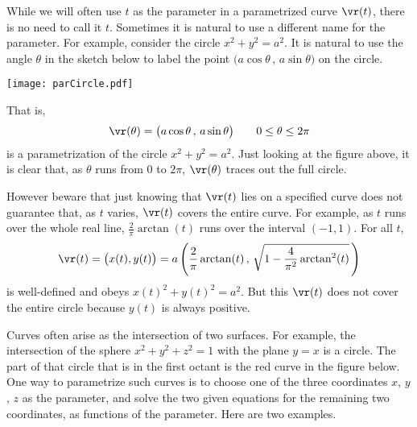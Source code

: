 \begin{eg}\label{eg:paramCircle}
While we will often use $t$ as the parameter in a parametrized curve $\vr(t)$,
there is no need to call it $t$. Sometimes it is natural to use a different 
name for the parameter. For example, consider the circle $x^2+y^2=a^2$.
It is natural to use the angle $\theta$ in the sketch below to label
the point $\big(a\cos\theta\,,\,a\sin\theta\big)$ on the circle. 
\begin{efig}
\begin{center}
     \texttt{[image: parCircle.pdf]}
\end{center}
\end{efig}
That is,
\begin{equation*}
\vr(\theta) = \big(a\cos\theta\,,\,a\sin\theta\big)\qquad
0\le \theta\le 2\pi
\end{equation*}
is a parametrization of the circle $x^2+y^2=a^2$. Just looking at the figure above, it is clear that, as $\theta$ runs from $0$ to $2\pi$, $\vr(\theta)$
traces out the full circle. 

However beware that just knowing that 
$\vr(t)$ lies on a specified curve does not guarantee that, as $t$ varies,
$\vr(t)$ covers the entire curve. For example, as $t$ runs over the whole
real line, $\frac{2}{\pi}\arctan(t)$ runs over the interval $(-1,1)$.
For all $t$,
\begin{equation*}
\vr(t) = \big(x(t),y(t)\big) 
       = a\left(\frac{2}{\pi}\arctan(t)\,,\,
                \sqrt{1-\frac{4}{\pi^2}\arctan^2(t)}\,\right)
\end{equation*}
is well-defined and obeys $x(t)^2+y(t)^2=a^2$. But this $\vr(t)$ does not
cover the entire circle because $y(t)$ is always positive.

\end{eg}

Curves often arise as the intersection of two surfaces. For example,
the intersection of the sphere $x^2+y^2+z^2=1$
with the plane $y=x$ is a circle. The part of that circle that is
in the first octant is the red curve in the figure below.
One way to parametrize such curves is to
choose one of the three coordinates $x$, $y$, $z$ as the parameter,
and solve the two given equations for the remaining two coordinates,
as functions of the parameter. Here are two examples.

